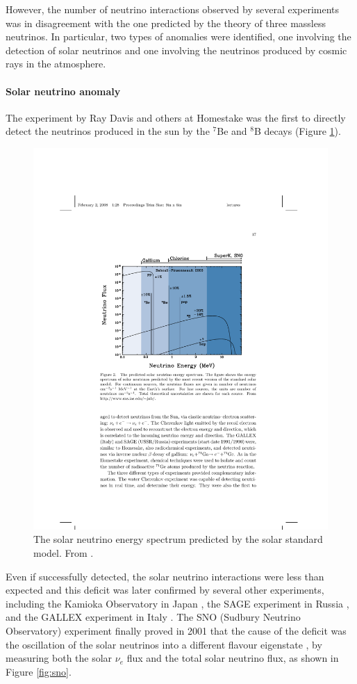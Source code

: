 However, the number of neutrino interactions observed by several experiments was in disagreement with the one predicted by the theory of three massless neutrinos. In particular, two types of anomalies were identified, one involving the detection of solar neutrinos and one involving the neutrinos produced by cosmic rays in the atmosphere.

\paragraph{Solar neutrino anomaly}
The experiment by Ray Davis and others at Homestake was the first to directly detect the neutrinos produced in the sun \cite{Davis:1968cp} by the $^7$Be and $^8$B decays (Figure \ref{fig:solar}). 

\begin{figure}[htbp]
    \centering
    \includegraphics[width=0.75\linewidth]{figures/solar.pdf}
    \caption{The solar neutrino energy spectrum predicted by the solar standard model. From \cite{Bahcall:2000nu}.}
    \label{fig:solar}
\end{figure}

Even if successfully detected, the solar neutrino interactions were less than expected and this deficit was later confirmed by several other experiments, including the Kamioka Observatory in Japan \cite{Hirata:1989zj}, the SAGE experiment in Russia \cite{Abdurashitov:1994bc}, and the GALLEX experiment in Italy \cite{Hampel:1998xg}. The SNO (Sudbury Neutrino Observatory) experiment finally proved in 2001 that the cause of the deficit was the oscillation of the solar neutrinos into a different flavour eigenstate \cite{Ahmad:2002jz}, by measuring both the solar $\nu_{e}$ flux and the total solar neutrino flux, as shown in Figure \ref{fig:sno}. 

